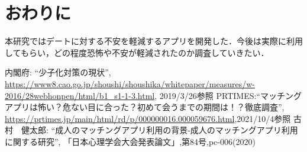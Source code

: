 \documentclass[twocolumn,10pt,a4j]{ltjsarticle}
\begin{document}
\section{おわりに}
本研究ではデートに対する不安を軽減するアプリを開発した．今後は実際に利用してもらい，どの程度恐怖や不安が軽減されたのか調査していきたい．

\begin{thebibliography}{99}
 内閣府: ``少子化対策の現状'', \url{https://www8.cao.go.jp/shoushi/shoushika/whitepaper/measures/w-2016/28webhonpen/html/b1_s1-1-3.html}, 2019/3/26参照
PRTIMES:``マッチングアプリは怖い？危ない目に合った？初めて会うまでの期間は！？徹底調査'',
\url{https://prtimes.jp/main/html/rd/p/000000016.000059676.html},2021/10/4参照
 古村　健太郎: ``成人のマッチングアプリ利用の背景-成人のマッチングアプリ利用に関する研究'', 「日本心理学会大会発表論文」,第84号,pc-006(2020)

\end{thebibliography}
\end{document}
